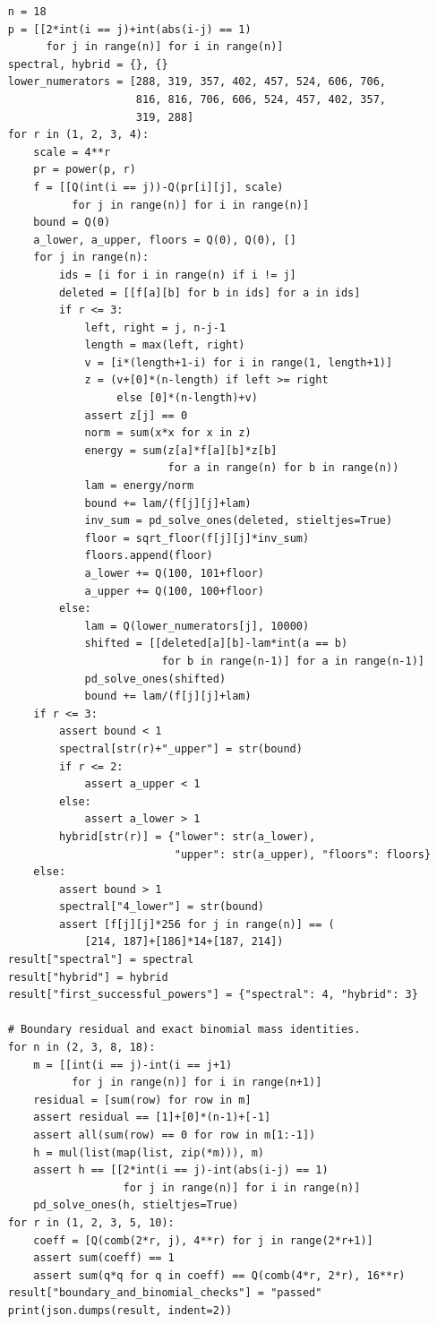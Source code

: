 \documentclass[11pt,a4paper,oneside]{report}
\theoremstyle{definition}
\theoremstyle{remark}
\begin{document}
\begin{lstlisting}
    n = 18
    p = [[2*int(i == j)+int(abs(i-j) == 1)
          for j in range(n)] for i in range(n)]
    spectral, hybrid = {}, {}
    lower_numerators = [288, 319, 357, 402, 457, 524, 606, 706,
                        816, 816, 706, 606, 524, 457, 402, 357,
                        319, 288]
    for r in (1, 2, 3, 4):
        scale = 4**r
        pr = power(p, r)
        f = [[Q(int(i == j))-Q(pr[i][j], scale)
              for j in range(n)] for i in range(n)]
        bound = Q(0)
        a_lower, a_upper, floors = Q(0), Q(0), []
        for j in range(n):
            ids = [i for i in range(n) if i != j]
            deleted = [[f[a][b] for b in ids] for a in ids]
            if r <= 3:
                left, right = j, n-j-1
                length = max(left, right)
                v = [i*(length+1-i) for i in range(1, length+1)]
                z = (v+[0]*(n-length) if left >= right
                     else [0]*(n-length)+v)
                assert z[j] == 0
                norm = sum(x*x for x in z)
                energy = sum(z[a]*f[a][b]*z[b]
                             for a in range(n) for b in range(n))
                lam = energy/norm
                bound += lam/(f[j][j]+lam)
                inv_sum = pd_solve_ones(deleted, stieltjes=True)
                floor = sqrt_floor(f[j][j]*inv_sum)
                floors.append(floor)
                a_lower += Q(100, 101+floor)
                a_upper += Q(100, 100+floor)
            else:
                lam = Q(lower_numerators[j], 10000)
                shifted = [[deleted[a][b]-lam*int(a == b)
                            for b in range(n-1)] for a in range(n-1)]
                pd_solve_ones(shifted)
                bound += lam/(f[j][j]+lam)
        if r <= 3:
            assert bound < 1
            spectral[str(r)+"_upper"] = str(bound)
            if r <= 2:
                assert a_upper < 1
            else:
                assert a_lower > 1
            hybrid[str(r)] = {"lower": str(a_lower),
                              "upper": str(a_upper), "floors": floors}
        else:
            assert bound > 1
            spectral["4_lower"] = str(bound)
            assert [f[j][j]*256 for j in range(n)] == (
                [214, 187]+[186]*14+[187, 214])
    result["spectral"] = spectral
    result["hybrid"] = hybrid
    result["first_successful_powers"] = {"spectral": 4, "hybrid": 3}

    # Boundary residual and exact binomial mass identities.
    for n in (2, 3, 8, 18):
        m = [[int(i == j)-int(i == j+1)
              for j in range(n)] for i in range(n+1)]
        residual = [sum(row) for row in m]
        assert residual == [1]+[0]*(n-1)+[-1]
        assert all(sum(row) == 0 for row in m[1:-1])
        h = mul(list(map(list, zip(*m))), m)
        assert h == [[2*int(i == j)-int(abs(i-j) == 1)
                      for j in range(n)] for i in range(n)]
        pd_solve_ones(h, stieltjes=True)
    for r in (1, 2, 3, 5, 10):
        coeff = [Q(comb(2*r, j), 4**r) for j in range(2*r+1)]
        assert sum(coeff) == 1
        assert sum(q*q for q in coeff) == Q(comb(4*r, 2*r), 16**r)
    result["boundary_and_binomial_checks"] = "passed"
    print(json.dumps(result, indent=2))



\end{lstlisting}
\end{document}
